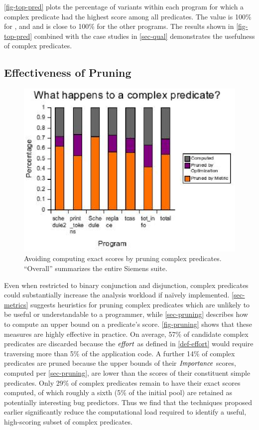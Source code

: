 \autoref{fig-top-pred} plots the percentage of variants within each program for which a complex predicate had the highest score among all predicates.  The value is 100\% for ,  and  and is close to 100\% for the other programs.  The results shown in \autoref{fig-top-pred} combined with the case studies in \autoref{sec-qual} demonstrates the usefulness of complex predicates.

\subsection{Effectiveness of Pruning}
\label{sec-effectprune}
\begin{figure}
  \centering
  \includegraphics{charts/pruning}
  \caption{Avoiding computing exact scores by pruning complex predicates.  ``Overall'' summarizes the entire Siemens suite.}
  \label{fig-pruning}
\end{figure}

Even when restricted to binary conjunction and disjunction, complex predicates could substantially increase the analysis workload if na\"ively implemented.  \autoref{sec-metrics} suggests heuristics for pruning complex predicates which are unlikely to be useful or understandable to a programmer, while \autoref{sec-pruning} describes how to compute an upper bound on a predicate's score.  \autoref{fig-pruning} shows that these measures are highly effective in practice.  On average, 57\% of candidate complex predicates are discarded because the $\mathit{effort}$ as defined in \autoref{def-effort} would require traversing more than 5\% of the application code.  A further 14\% of complex predicates are pruned because the upper bounds of their $\mathit{Importance}$ scores, computed per \autoref{sec-pruning}, are lower than the scores of their constituent simple predicates.  Only 29\% of complex predicates remain to have their exact scores computed, of which roughly a sixth (5\% of the initial pool) are retained as potentially interesting bug predictors.  Thus we find that the techniques proposed earlier significantly reduce the computational load required to identify a useful, high-scoring subset of complex predicates.

